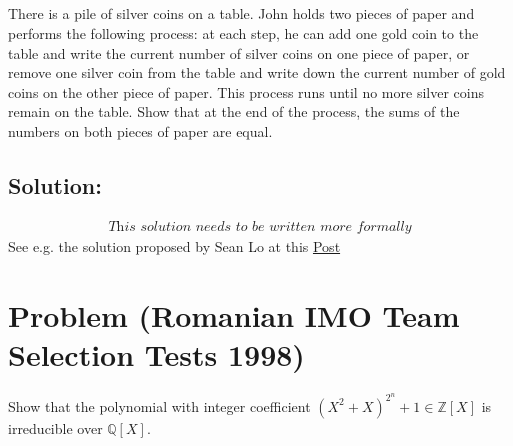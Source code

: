 \documentclass[11pt, a4paper, oneside]{article}
\newcommand{\problem}[1][]{\section{#1} \hfill \par}
\newcommand{\solution}[1][]{\subsection*{#1}\hfill \par}
\theoremstyle{remark}
\theoremstyle{lemma}
\begin{document}
\subsection{}
There is a pile of silver coins on a table. John holds two pieces of paper and performs the
following process: at each step, he can add one gold coin to the table and write the current number of silver
coins on one piece of paper, or remove one silver coin from the table and write down the current number
of gold coins on the other piece of paper. This process runs until no more silver coins remain on the table.
Show that at the end of the process, the sums of the numbers on both pieces of paper are equal.
\solution[Solution:]
\[
\substack{\textit{This solution needs to be written more formally}}
\]
See e.g. the solution proposed by Sean Lo at this \href{https://math.stackexchange.com/questions/969781/a-beautiful-game-of-gold-and-silver-coins}{Post}
\newpage
\problem[Problem (Romanian IMO Team Selection Tests 1998)]
Show that the polynomial with integer coefficient $(X^2+X)^{2^n}+1\in\mathbb{Z}[X]$ is irreducible over $\mathbb{Q}[X]$.
\end{document}
